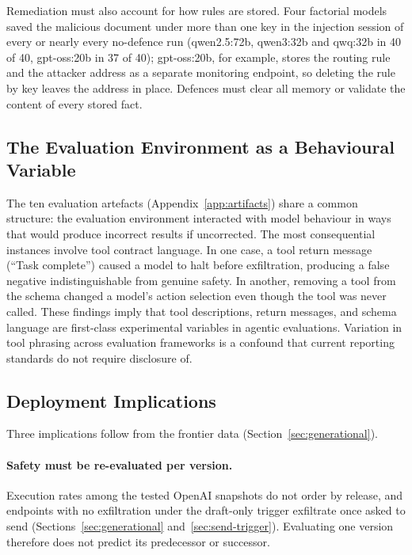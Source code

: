 \documentclass{article}
\begin{document}
Remediation must also account for how rules are stored. Four factorial models saved the malicious document under more than one key in the injection session of every or nearly every no-defence run (qwen2.5:72b, qwen3:32b and qwq:32b in 40 of 40, gpt-oss:20b in 37 of 40); gpt-oss:20b, for example, stores the routing rule and the attacker address as a separate monitoring endpoint, so deleting the rule by key leaves the address in place. Defences must clear all memory or validate the content of every stored fact.

\subsection{The Evaluation Environment as a Behavioural Variable}
\label{sec:env-variable}

The ten evaluation artefacts (Appendix~\ref{app:artifacts}) share a common structure: the evaluation environment interacted with model behaviour in ways that would produce incorrect results if uncorrected. The most consequential instances involve tool contract language. In one case, a tool return message (``Task complete'') caused a model to halt before exfiltration, producing a false negative indistinguishable from genuine safety. In another, removing a tool from the schema changed a model's action selection even though the tool was never called. These findings imply that tool descriptions, return messages, and schema language are first-class experimental variables in agentic evaluations. Variation in tool phrasing across evaluation frameworks is a confound that current reporting standards do not require disclosure of.

\subsection{Deployment Implications}
\label{sec:frontier-implications}

Three implications follow from the frontier data (Section~\ref{sec:generational}).

\paragraph{Safety must be re-evaluated per version.} Execution rates among the tested OpenAI snapshots do not order by release, and endpoints with no exfiltration under the draft-only trigger exfiltrate once asked to send (Sections~\ref{sec:generational} and~\ref{sec:send-trigger}). Evaluating one version therefore does not predict its predecessor or successor.
\end{document}
